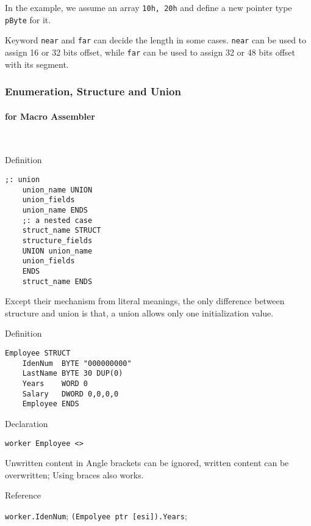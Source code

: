 In the example, we assume an array \verb|10h, 20h| and define a new pointer type \verb|pByte| for it. 

Keyword \verb`near` and \verb`far` can decide the length in some cases.
\verb`near` can be used to assign 16 or 32 bits offset,
while \verb`far` can be used to assign 32 or 48 bits offset with its segment.


\subsubsection{Enumeration, Structure and Union}

\paragraph{for Macro Assembler} \

{Definition}
\begin{lstlisting}[language={[x86masm]Assembler}]
	;: union
	union_name UNION
	union_fields
	union_name ENDS
	;: a nested case
	struct_name STRUCT
	structure_fields
	UNION union_name
	union_fields
	ENDS
	struct_name ENDS
\end{lstlisting}

Except their mechanism from literal meanings, the only difference between structure and union is that, a union allows only one initialization value.


{Definition}
\begin{lstlisting}[language={[x86masm]Assembler}]
	Employee STRUCT
	IdenNum  BYTE "000000000"
	LastName BYTE 30 DUP(0)
	Years    WORD 0
	Salary   DWORD 0,0,0,0
	Employee ENDS
\end{lstlisting}

{Declaration}
\begin{lstlisting}[language={[x86masm]Assembler}]
	worker Employee <>
\end{lstlisting}

Unwritten content in Angle brackets can be ignored, written content can be overwritten; Using braces also works.

{Reference}

\verb|worker.IdenNum|; \verb|(Empolyee ptr [esi]).Years|;



